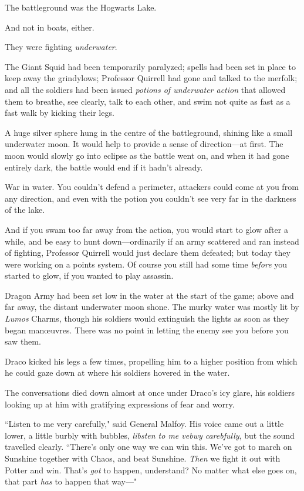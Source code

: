 The battleground was the Hogwarts Lake.

And not in boats, either.

They were fighting \emph{underwater}.

The Giant Squid had been temporarily paralyzed; spells had been set in place to keep away the grindylows; Professor Quirrell had gone and talked to the merfolk; and all the soldiers had been issued \emph{potions of underwater action} that allowed them to breathe, see clearly, talk to each other, and swim not quite as fast as a fast walk by kicking their legs.

A huge silver sphere hung in the centre of the battleground, shining like a small underwater moon. It would help to provide a sense of direction—at first. The moon would slowly go into eclipse as the battle went on, and when it had gone entirely dark, the battle would end if it hadn't already.

War in water. You couldn't defend a perimeter, attackers could come at you from any direction, and even with the potion you couldn't see very far in the darkness of the lake.

And if you swam too far away from the action, you would start to glow after a while, and be easy to hunt down—ordinarily if an army scattered and ran instead of fighting, Professor Quirrell would just declare them defeated; but today they were working on a points system. Of course you still had some time \emph{before} you started to glow, if you wanted to play assassin.

Dragon Army had been set low in the water at the start of the game; above and far away, the distant underwater moon shone. The murky water was mostly lit by \emph{Lumos} Charms, though his soldiers would extinguish the lights as soon as they began manœuvres. There was no point in letting the enemy see you before you saw them.

Draco kicked his legs a few times, propelling him to a higher position from which he could gaze down at where his soldiers hovered in the water.

The conversations died down almost at once under Draco's icy glare, his soldiers looking up at him with gratifying expressions of fear and worry.

``Listen to me very carefully," said General Malfoy. His voice came out a little lower, a little burbly with bubbles, \emph{libsten to me vebwy carebfully}, but the sound travelled clearly. ``There's only one way we can win this. We've got to march on Sunshine together with Chaos, and beat Sunshine. \emph{Then} we fight it out with Potter and win. That's \emph{got} to happen, understand? No matter what else goes on, that part \emph{has} to happen that way—"


